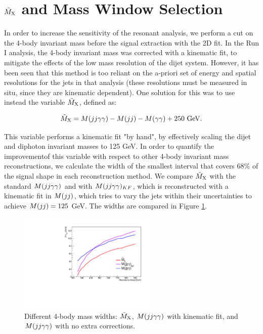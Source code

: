 \section{ $\tilde{M}_{\mathrm{X}}$ and Mass Window Selection}
\label{sec:masswindow}

In order to increase the sensitivity of the resonant analysis, we perform a cut on the 4-body invariant mass before the signal extraction with the 2D fit.
In the Run I analysis, the 4-body invariant mass was corrected with a kinematic fit, to mitigate the effects of the low mass resolution of the dijet system.
However, it has been seen that this method is too reliant on the a-priori set of energy and spatial resolutions for the jets in that analysis (these resolutions must be measured in situ, since they are kinematic dependent).
One solution for this was to use instead the variable $\tilde{M}_{\mathrm{X}}$, defined as:

\begin{equation}
\tilde{M}_{\mathrm{X}} = M(jj\gamma\gamma) - M(jj) - M(\gamma\gamma) + 250 \text{ GeV}.
\end{equation}

This variable performs a kinematic fit "by hand", by effectively scaling the dijet and diphoton invariant masses to 125 GeV. 
In order to quantify the improvementof this variable with respect to other 4-body invariant mass reconstructions, we calculate the width of the smallest interval that covers $68\%$ of the signal shape in each reconstruction method. 
We compare $\tilde{M}_{\mathrm{X}}$ with the standard $M(jj\gamma\gamma)$ and with $M(jj\gamma\gamma)_{KF}$, which is reconstructed with a kinematic fit in $M(jj)$, which tries to vary the jets within their uncertainties to achieve $M(jj) = 125$ GeV. 
The widths are compared in Figure \ref{fig:mxwidth}. 

\begin{figure}[thb]
  \centering
  \includegraphics[width=0.6\textwidth]{figures/sec-window/width_67_prime.pdf}\hfil
  \caption{Different 4-body mass widths: $\tilde{M}_{\mathrm{X}}$, $M(jj\gamma\gamma)$ with kinematic fit, and $M(jj\gamma\gamma)$ with no extra corrections.}
  \label{fig:mxwidth}
\end{figure}

